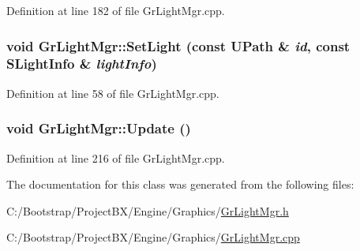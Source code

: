 Definition at line 182 of file GrLightMgr.cpp.\hypertarget{class_gr_light_mgr_aa93ff46c80e5fdbc8cecdfce13d5a99}{
\subsubsection[{SetLight}]{\setlength{\rightskip}{0pt plus 5cm}void GrLightMgr::SetLight (const {\bf UPath} \& {\em id}, \/  const {\bf SLightInfo} \& {\em lightInfo})}}
\label{class_gr_light_mgr_aa93ff46c80e5fdbc8cecdfce13d5a99}




Definition at line 58 of file GrLightMgr.cpp.\hypertarget{class_gr_light_mgr_8e7e04849ad7d91f6e5a330b6d9fe996}{
\subsubsection[{Update}]{\setlength{\rightskip}{0pt plus 5cm}void GrLightMgr::Update ()}}
\label{class_gr_light_mgr_8e7e04849ad7d91f6e5a330b6d9fe996}




Definition at line 216 of file GrLightMgr.cpp.

The documentation for this class was generated from the following files:\begin{CompactItemize}
\item 
C:/Bootstrap/ProjectBX/Engine/Graphics/\hyperlink{_gr_light_mgr_8h}{GrLightMgr.h}\item 
C:/Bootstrap/ProjectBX/Engine/Graphics/\hyperlink{_gr_light_mgr_8cpp}{GrLightMgr.cpp}\end{CompactItemize}
